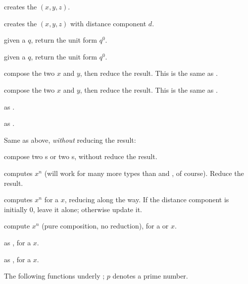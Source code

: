  creates the  $(x,y,z)$.

 creates the  $(x,y,z)$
with distance component $d$.

 given a  $q$, return the unit form $q^0$.

 given a  $q$, return the unit form $q^0$.


 compose the two  $x$ and $y$,
then reduce the result. This is the same as .

 compose the two  $x$ and $y$,
then reduce the result. This is the same as .

 as .

 as .

\noindent Same as above, \emph{without} reducing the result:





 compose two s or two s,
without reduce the result.


 computes $x^n$ (will work for many more types
than  and , of course). Reduce the result.

 computes $x^n$ for a  $x$, reducing
along the way. If the distance component is initially $0$, leave it alone;
otherwise update it.

 compute $x^n$ (pure composition, no
reduction), for a  or  $x$.

 as , for a  $x$.

 as , for a  $x$.


The following functions underly ; $p$ denotes a prime number.

